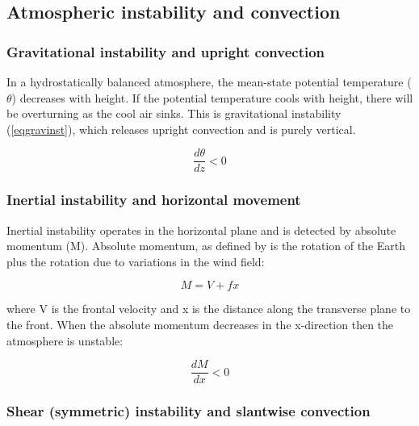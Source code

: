 
\subsection{Atmospheric instability and convection} %

\subsubsection {Gravitational instability and upright convection}

In a hydrostatically balanced atmosphere, the mean-state potential temperature ($\theta$) decreases with height. If the potential temperature cools with height, there will be overturning as the cool air sinks. This is gravitational instability (\ref{eqgravinst}), which releases upright convection and is purely vertical.

\begin{equation} \label{eqgravinst}
\frac{d\theta}{dz} < 0
\end{equation}


\subsubsection {Inertial instability and horizontal movement}
Inertial instability operates in the horizontal plane and is detected by absolute momentum (M). Absolute momentum, as defined by \cite{eliassen1962vertical} is the rotation of the Earth plus the rotation due to variations in the wind field:

\begin{equation} \label{eqM}
M = V + fx
\end{equation}



where V is the frontal velocity and x is the distance along the transverse plane to the front. When the absolute momentum decreases in the x-direction then the atmosphere is unstable:

\begin{equation} \label{eq_iner_inst}
\frac{dM}{dx} < 0
\end{equation}


\subsubsection {Shear (symmetric) instability and slantwise convection}


